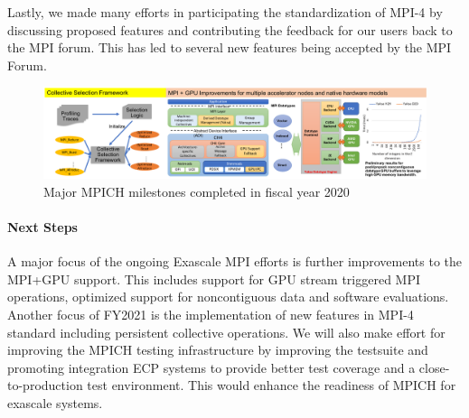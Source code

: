 Lastly, we made many efforts in participating the standardization of
MPI-4 by discussing proposed features and contributing the feedback for
our users back to the MPI forum. This has led to several new features
being accepted by the MPI Forum.

\begin{figure}[htb]
  \centering
  \includegraphics[width=6in]{projects/2.3.1-PMR/2.3.1.07-Exascale-MPI/MPICH-recent-milestones.pdf}
  \caption{\label{fig:fy20}Major MPICH milestones completed in fiscal year 2020}
\end{figure}

\paragraph{Next Steps}
A major focus of the ongoing Exascale MPI efforts is further
improvements to the MPI+GPU support. This includes support for GPU
stream triggered MPI operations, optimized support for noncontiguous
data and software evaluations. Another focus of FY2021 is the
implementation of new features in MPI-4 standard including persistent
collective operations. We will also make effort for improving the MPICH
testing infrastructure by improving the testsuite and promoting
integration ECP systems to provide better test coverage and a
close-to-production test environment. This would enhance the readiness
of MPICH for exascale systems.
